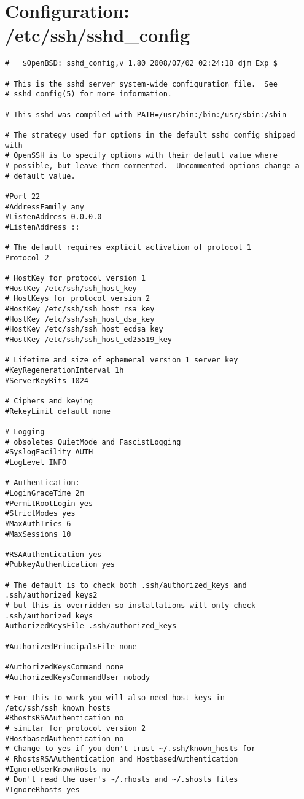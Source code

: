 \section{Configuration: /etc/ssh/sshd\_config}
\label{section:appendix-ssh-sshdconfig}
\begin{verbatim}
#	$OpenBSD: sshd_config,v 1.80 2008/07/02 02:24:18 djm Exp $

# This is the sshd server system-wide configuration file.  See
# sshd_config(5) for more information.

# This sshd was compiled with PATH=/usr/bin:/bin:/usr/sbin:/sbin

# The strategy used for options in the default sshd_config shipped with
# OpenSSH is to specify options with their default value where
# possible, but leave them commented.  Uncommented options change a
# default value.

#Port 22
#AddressFamily any
#ListenAddress 0.0.0.0
#ListenAddress ::

# The default requires explicit activation of protocol 1
Protocol 2

# HostKey for protocol version 1
#HostKey /etc/ssh/ssh_host_key
# HostKeys for protocol version 2
#HostKey /etc/ssh/ssh_host_rsa_key
#HostKey /etc/ssh/ssh_host_dsa_key
#HostKey /etc/ssh/ssh_host_ecdsa_key
#HostKey /etc/ssh/ssh_host_ed25519_key

# Lifetime and size of ephemeral version 1 server key
#KeyRegenerationInterval 1h
#ServerKeyBits 1024

# Ciphers and keying
#RekeyLimit default none

# Logging
# obsoletes QuietMode and FascistLogging
#SyslogFacility AUTH
#LogLevel INFO

# Authentication:
#LoginGraceTime 2m
#PermitRootLogin yes
#StrictModes yes
#MaxAuthTries 6
#MaxSessions 10

#RSAAuthentication yes
#PubkeyAuthentication yes

# The default is to check both .ssh/authorized_keys and .ssh/authorized_keys2
# but this is overridden so installations will only check .ssh/authorized_keys
AuthorizedKeysFile .ssh/authorized_keys

#AuthorizedPrincipalsFile none

#AuthorizedKeysCommand none
#AuthorizedKeysCommandUser nobody

# For this to work you will also need host keys in /etc/ssh/ssh_known_hosts
#RhostsRSAAuthentication no
# similar for protocol version 2
#HostbasedAuthentication no
# Change to yes if you don't trust ~/.ssh/known_hosts for
# RhostsRSAAuthentication and HostbasedAuthentication
#IgnoreUserKnownHosts no
# Don't read the user's ~/.rhosts and ~/.shosts files
#IgnoreRhosts yes


\end{verbatim}
